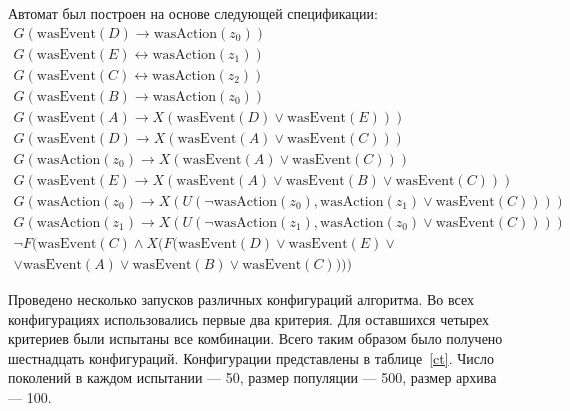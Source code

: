 \documentclass[12pt,fleqn]{article}
\begin{document}
Автомат был построен на основе следующей спецификации:
\begin{multline*}
G(\text{wasEvent}(D) \rightarrow \text{wasAction}(z_0))\\
G(\text{wasEvent}(E) \leftrightarrow \text{wasAction}(z_1))\\
G(\text{wasEvent}(C) \leftrightarrow \text{wasAction}(z_2))\\
G(\text{wasEvent}(B) \rightarrow \text{wasAction}(z_0))\\
G(\text{wasEvent}(A) \rightarrow X(\text{wasEvent}(D) \vee \text{wasEvent}(E)))\\
G(\text{wasEvent}(D) \rightarrow X(\text{wasEvent}(A) \vee \text{wasEvent}(C)))\\
G(\text{wasAction}(z_0) \rightarrow X(\text{wasEvent}(A) \vee \text{wasEvent}(C)))\\
G(\text{wasEvent}(E) \rightarrow X(\text{wasEvent}(A) \vee \text{wasEvent}(B) \vee \text{wasEvent}(C)))\\
G(\text{wasAction}(z_0) \rightarrow X(U(\lnot \text{wasAction}(z_0), \text{wasAction}(z_1) \vee \text{wasEvent}(C))))\\
G(\text{wasAction}(z_1) \rightarrow X(U(\lnot \text{wasAction}(z_1), \text{wasAction}(z_0) \vee \text{wasEvent}(C))))\\
\lnot F(\text{wasEvent}(C) \wedge X(F(\text{wasEvent}(D) \vee \text{wasEvent}(E) \vee \\ \vee \text{wasEvent}(A) \vee \text{wasEvent}(B) \vee \text{wasEvent}(C))))
\end{multline*}

Проведено несколько запусков различных конфигураций алгоритма. Во всех конфигурациях использовались первые два критерия.
Для оставшихся четырех критериев были испытаны все комбинации. Всего таким образом было получено шестнадцать конфигураций.
Конфигурации представлены в таблице~\ref{ct}. Число поколений в каждом испытании --- 50, размер популяции --- 500, размер архива --- 100.
\end{document}
